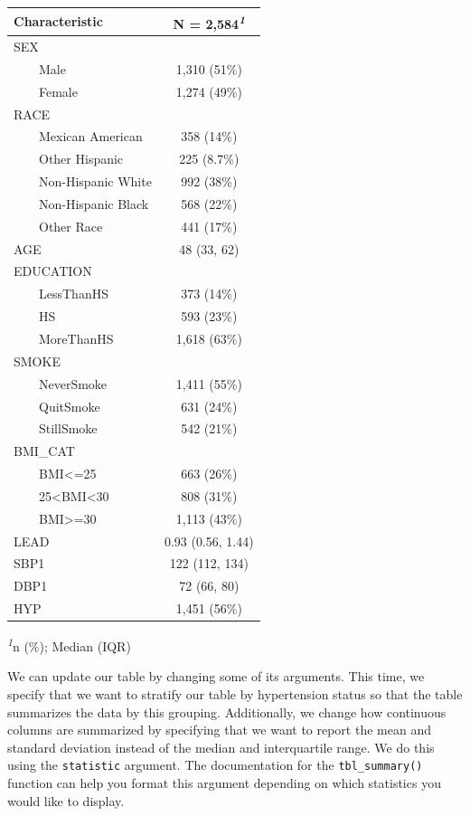 \documentclass[
  letterpaper,
]{latex/krantz}
\begin{document}
\setlength{\LTpost}{0mm}
\begin{longtable*}{lc}
\toprule
\textbf{Characteristic} & \textbf{N = 2,584}\textsuperscript{\textit{1}} \\ 
\midrule\addlinespace[2.5pt]
SEX &  \\ 
    Male & 1,310 (51\%) \\ 
    Female & 1,274 (49\%) \\ 
RACE &  \\ 
    Mexican American & 358 (14\%) \\ 
    Other Hispanic & 225 (8.7\%) \\ 
    Non-Hispanic White & 992 (38\%) \\ 
    Non-Hispanic Black & 568 (22\%) \\ 
    Other Race & 441 (17\%) \\ 
AGE & 48 (33, 62) \\ 
EDUCATION &  \\ 
    LessThanHS & 373 (14\%) \\ 
    HS & 593 (23\%) \\ 
    MoreThanHS & 1,618 (63\%) \\ 
SMOKE &  \\ 
    NeverSmoke & 1,411 (55\%) \\ 
    QuitSmoke & 631 (24\%) \\ 
    StillSmoke & 542 (21\%) \\ 
BMI\_CAT &  \\ 
    BMI<=25 & 663 (26\%) \\ 
    25<BMI<30 & 808 (31\%) \\ 
    BMI>=30 & 1,113 (43\%) \\ 
LEAD & 0.93 (0.56, 1.44) \\ 
SBP1 & 122 (112, 134) \\ 
DBP1 & 72 (66, 80) \\ 
HYP & 1,451 (56\%) \\ 
\bottomrule
\end{longtable*}
\begin{minipage}{\linewidth}
\textsuperscript{\textit{1}}n (\%); Median (IQR)\\
\end{minipage}

We can update our table by changing some of its arguments. This time, we
specify that we want to stratify our table by hypertension status so
that the table summarizes the data by this grouping. Additionally, we
change how continuous columns are summarized by specifying that we want
to report the mean and standard deviation instead of the median and
interquartile range. We do this using the \texttt{statistic} argument.
The documentation for the \texttt{tbl\_summary()} function can help you
format this argument depending on which statistics you would like to
display.
\end{document}
